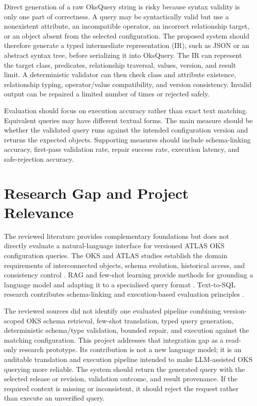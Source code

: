 \documentclass[12pt, a4paper]{report}
\begin{document}
Direct generation of a raw OksQuery string is risky because syntax validity is
only one part of correctness. A query may be syntactically valid but use a
nonexistent attribute, an incompatible operator, an incorrect relationship
target, or an object absent from the selected configuration. The proposed
system should therefore generate a typed intermediate representation (IR),
such as JSON or an abstract syntax tree, before serializing it into OksQuery.
The IR can represent the target class, predicates, relationship traversal,
values, version, and result limit. A deterministic validator can then check
class and attribute existence, relationship typing, operator/value
compatibility, and version consistency. Invalid output can be repaired a
limited number of times or rejected safely.

Evaluation should focus on execution accuracy rather than exact text matching.
Equivalent queries may have different textual forms. The main measure should
be whether the validated query runs against the intended configuration version
and returns the expected objects. Supporting measures should include
schema-linking accuracy, first-pass validation rate, repair success rate,
execution latency, and safe-rejection accuracy.

\section{Research Gap and Project Relevance}
The reviewed literature provides complementary foundations but does not
directly evaluate a natural-language interface for versioned ATLAS OKS
configuration queries. The OKS and ATLAS studies establish the domain
requirements of interconnected objects, schema evolution, historical access,
and consistency control \cite{oks_paper,alexandrov2007,soloviev_vcs,atlas_git}.
RAG and few-shot learning provide methods for grounding a language model and
adapting it to a specialised query format \cite{rag,gpt3}. Text-to-SQL
research contributes schema-linking and execution-based evaluation principles
\cite{text2sql_survey}.

The reviewed sources did not identify one evaluated pipeline combining
version-scoped OKS schema retrieval, few-shot translation, typed query
generation, deterministic schema/type validation, bounded repair, and
execution against the matching configuration. This project addresses that
integration gap as a read-only research prototype. Its contribution is not a
new language model; it is an auditable translation and execution pipeline
intended to make LLM-assisted OKS querying more reliable. The system should
return the generated query with the selected release or revision, validation
outcome, and result provenance. If the required context is missing or
inconsistent, it should reject the request rather than execute an unverified
query.
\end{document}
